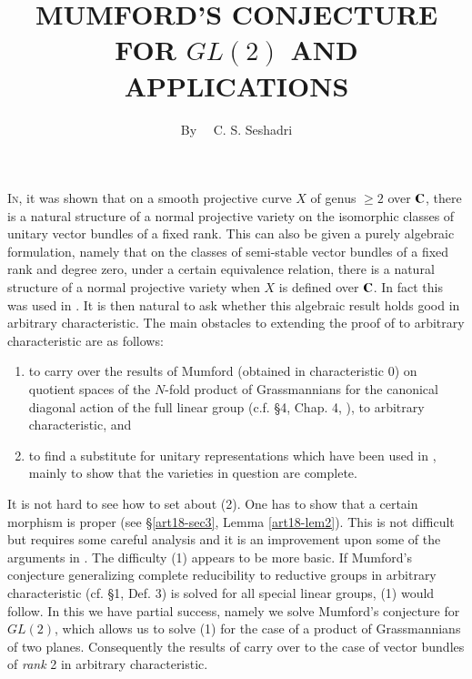 \title{MUMFORD'S CONJECTURE FOR $GL(2)$ AND APPLICATIONS}

\author{By~~ C. S. Seshadri}
\date{}

\maketitle

\setcounter{pageoriginal}{346}
\textsc{In}\pageoriginale \cite{art18-key12}, it was shown that on a smooth projective curve $X$ of genus $\geq 2$ over $\mathbf{C}$, there is a natural structure of a normal projective variety on the isomorphic classes of unitary vector bundles of a fixed rank. This can also be given a purely algebraic formulation, namely that on the classes of semi-stable vector bundles of a fixed rank and degree zero, under a certain equivalence relation, there is a natural structure of a normal projective variety when $X$ is defined over $\mathbf{C}$. In fact this was used in \cite{art18-key12}. It is then natural to ask whether this algebraic result holds good in arbitrary characteristic. The main obstacles to extending the proof of \cite{art18-key12} to arbitrary characteristic are as follows:
\begin{enumerate}
\renewcommand{\labelenumi}{(\theenumi)}
\item to carry over the results of Mumford (obtained in characteristic 0) on quotient spaces of the $N$-fold product of Grassmannians for the canonical diagonal action of the full linear group (c.f. \S4, Chap. 4, \cite{art18-key5}), to arbitrary characteristic, and

\item to find a substitute for unitary representations which have been used in \cite{art18-key12}, mainly to show that the varieties in question are complete.
\end{enumerate}

It is not hard to see how to set about (2). One has to show that a certain morphism is proper (see \S\ref{art18-sec3}, Lemma \ref{art18-lem2}). This is not difficult but requires some careful analysis and it is an improvement upon some of the arguments in \cite{art18-key12}. The difficulty (1) appears to be more basic. If Mumford's conjecture generalizing complete reducibility to reductive groups in arbitrary characteristic (cf. \S1, Def. 3) is solved for all special linear groups, (1) would follow. In this we have partial success, namely we solve Mumford's conjecture for $GL(2)$, which allows us to solve (1) for the case of a product of Grassmannians of two planes. Consequently the results of \cite{art18-key12} carry over to the case of vector bundles of {\em rank} 2 in arbitrary characteristic.

